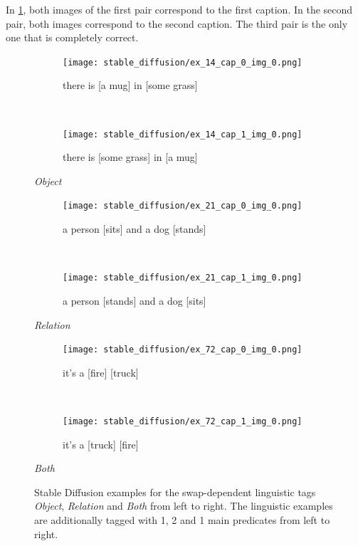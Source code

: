 In \cref{fig:stable-diffusion-examples-linguistic}, both images of the first pair correspond to the first caption. In the second pair, both images correspond to the second caption. The third pair is the only one that is completely correct.

\begin{figure}[ht]
\centering
    \begin{minipage}[t]{.30\textwidth}
        \begin{subfigure}[t]{\textwidth}
        \centering
        \texttt{[image: stable\_diffusion/ex\_14\_cap\_0\_img\_0.png]}
        \caption{there is [a mug] in [some grass]}
        \end{subfigure}\\
        \begin{subfigure}[t]{\textwidth}
        \centering
        \texttt{[image: stable\_diffusion/ex\_14\_cap\_1\_img\_0.png]}
        \caption{there is [some grass] in [a mug]}
        \end{subfigure}%
        \caption*{\textit{Object}}
    \end{minipage}
    \hfill
    \begin{minipage}[t]{.30\textwidth}
        \begin{subfigure}[t]{\textwidth}
        \centering
        \texttt{[image: stable\_diffusion/ex\_21\_cap\_0\_img\_0.png]}
        \caption{a person [sits] and a dog [stands]}
        \end{subfigure}\\
        \begin{subfigure}[t]{\textwidth}
        \centering
        \texttt{[image: stable\_diffusion/ex\_21\_cap\_1\_img\_0.png]}
        \caption{a person [stands] and a dog [sits]}
        \end{subfigure}%
        \caption*{\textit{Relation}}
    \end{minipage}
    \hfill
    \begin{minipage}[t]{.30\textwidth}
        \begin{subfigure}[t]{\textwidth}
        \centering
        \texttt{[image: stable\_diffusion/ex\_72\_cap\_0\_img\_0.png]}
        \caption{it's a [fire] [truck]}
        \end{subfigure}\\
        \begin{subfigure}[t]{\textwidth}
        \centering
        \texttt{[image: stable\_diffusion/ex\_72\_cap\_1\_img\_0.png]}
        \caption{it's a [truck] [fire]}
        \end{subfigure}%
        \caption*{\textit{Both}}
    \end{minipage}%
    \caption{Stable Diffusion examples for the swap-dependent linguistic tags \textit{Object}, \textit{Relation} and \textit{Both} from left to right. The linguistic examples are additionally tagged with 1, 2 and 1 main predicates from left to right.}
    \label{fig:stable-diffusion-examples-linguistic}
\end{figure}

